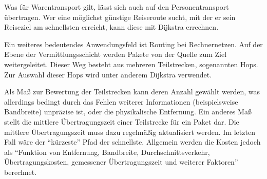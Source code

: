 \parindent0pt Was für Warentransport gilt, lässt sich auch auf den Personentransport übertragen. Wer eine möglichst günstige Reiseroute sucht, mit der er sein Reiseziel am schnellsten erreicht, kann diese mit Dijkstra errechnen.

\parindent0pt Ein weiteres bedeutendes Anwendungsfeld ist Routing bei Rechnernetzen. Auf der Ebene der Vermittlungsschicht werden Pakete von der Quelle zum Ziel weitergeleitet. Dieser Weg besteht aus mehreren Teilstrecken, sogenannten Hops. 
\cite[S.420 Z. 1-7]{Tan}
 Zur Auswahl dieser Hops wird unter anderem Dijkstra verwendet. 

\parindent0pt
Als Maß zur Bewertung der Teilstrecken kann deren Anzahl gewählt werden, was allerdings bedingt durch das Fehlen weiterer Informationen (beispielsweise Bandbreite) unpräzise ist, oder die physikalische Entfernung. Ein anderes Maß stellt die mittlere Übertragungszeit einer Teilstrecke für ein Paket dar. Die mittlere Übertragungszeit muss dazu regelmäßig aktualisiert werden. Im letzten Fall wäre der ``kürzeste'' Pfad der schnellste.
\cite[S.424, Z.1-5]{OttWid90}
Allgemein werden die Kosten jedoch als ``Funktion von Entfernung, Bandbreite, Durchschnittsverkehr, Übertragungskosten, gemessener Übertragungszeit und weiterer Faktoren''
\cite[S.424 Z.6-8]{OttWid90}
berechnet.
